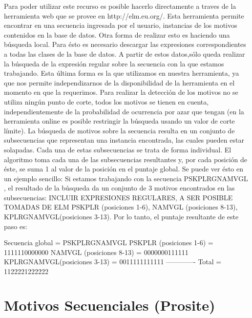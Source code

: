 Para poder utilizar este recurso es posible hacerlo directamente a traves de la herramienta web que se provee en http://elm.eu.org/. Esta herramienta permite encontrar en una secuencia ingresada por el usuario, instancias de los motivos contenidos en la base de datos.
Otra forma de realizar esto es haciendo una búsqueda local. Para ésto es necesario descargar las expresiones correspondientes a todas las clases de la base de datos. A partir de estos datos,sólo queda realizar la búsqueda de la expresión regular sobre la secuencia con la que estamos trabajando.
Esta última forma es la que utilizamos en nuestra herramienta, ya que nos permite independizarnos de la disponibilidad de la herramienta en el momento en que la requerimos.
Para realizar la detección de los motivos no se utiliza ningún punto de corte, todos los motivos se tienen en cuenta, independientemente de la probabilidad de ocurrencia por azar que tengan (en la herramienta online es posible restringir la búsqueda usando un valor de corte límite).
La búsqueda de motivos sobre la secuencia resulta en un conjunto de subsecuencias que representan una instancia encontrada, las cuales pueden estar solapadas. Cada una de estas subsecuencias se trata de forma individual.
El algoritmo toma cada una de las subsecuencias resultantes y, por cada posición de éste, se suma 1 al valor de la posición en el puntaje global.
Se puede ver ésto en un ejemplo sencillo:
Si estamos trabajando con la secuencia PSKPLRGNAMVGL , el resultado de la búsqueda da un conjunto de 3 motivos encontrados en las subsecuencias: INCLUIR EXPRESIONES REGULARES, A SER POSIBLE TOMADAS DE ELM
PSKPLR (posiciones 1-6), NAMVGL (posiciones 8-13), KPLRGNAMVGL(posiciones 3-13).
Por lo tanto, el puntaje resultante de este paso es:

Secuencia global             =   PSKPLRGNAMVGL
PSKPLR (posiciones 1-6)      =   1111110000000 
NAMVGL (posiciones 8-13)     =   0000000111111  
KPLRGNAMVGL(posiciones 3-13) =   0011111111111
 -------------
Total                        =   1122221222222



\section{Motivos Secuenciales (Prosite)}

